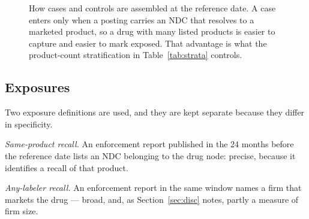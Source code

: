 \documentclass[conference,letterpaper]{IEEEtran}
\begin{document}
\begin{figure}[t]
\centering
{}
\caption{How cases and controls are assembled at the reference date. A case
enters only when a posting carries an NDC that resolves to a marketed product,
so a drug with many listed products is easier to capture and easier to mark
exposed. That advantage is what the product-count stratification in
Table~\ref{tab:strata} controls.}
\label{fig:design}
\end{figure}

\subsection{Exposures}
Two exposure definitions are used, and they are kept separate because they
differ in specificity.

\emph{Same-product recall.} An enforcement report \cite{openfda} published in
the 24 months before the reference date lists an NDC belonging to the drug node:
precise, because it identifies a recall of that product.

\emph{Any-labeler recall.} An enforcement report in the same window names a firm
that markets the drug --- broad, and, as Section~\ref{sec:disc} notes, partly a
measure of firm size.
\end{document}
